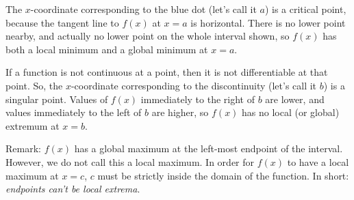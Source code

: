 \begin{solution}
\begin{center}\end{center}
The $x$-coordinate corresponding to the blue dot (let's call it $a$) is a critical point, because the tangent line to $f(x)$ at $x=a$ is horizontal. There is no lower point nearby, and actually no lower point on the whole interval shown, so $f(x)$ has both a local minimum and  a global minimum at $x=a$.

If a function is not continuous at a point, then it is not differentiable at that point. So, the $x$-coordinate  corresponding to the discontinuity (let's call it $b$) is a singular point. Values of $f(x)$ immediately to the right of $b$ are lower, and values immediately to the left of $b$ are higher, so $f(x)$ has no local (or global) extremum at $x=b$.


Remark: $f(x)$ has a global maximum at the left-most endpoint of the interval. However, we do not call this a local maximum. In order for $f(x)$ to have a local maximum at $x=c$, $c$ must be strictly inside the domain of the function. In short: \emph{endpoints can't be local extrema}.


\end{solution}


